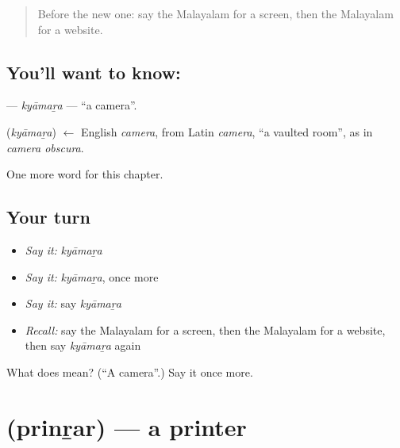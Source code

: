 \label{lesson:ML-C255-kyamara}



\begin{quote}
Before the new one: say the Malayalam for a screen, then the Malayalam for a website.
\end{quote}

\subsection*{You'll want to know: }
\textbf{} — \emph{kyāmaṟa} — \textquotedblleft{}a camera\textquotedblright{}.

\begin{cousinweb}
\textbf{} (\emph{kyāmaṟa}) $\leftarrow$ English \emph{camera}, from Latin \emph{camera}, \textquotedblleft{}a vaulted room\textquotedblright{}, as in \emph{camera obscura}.
\end{cousinweb}

\begin{grammarlens}[title={What you've built}]
One more word for this chapter.
\end{grammarlens}

\subsection*{Your turn}
\begin{itemize}
\raggedright
  \item \emph{Say it:} \emph{kyāmaṟa}
  \item \emph{Say it:} \emph{kyāmaṟa}, once more
  \item \emph{Say it:} say \emph{kyāmaṟa}
  \item \emph{Recall:} say the Malayalam for a screen, then the Malayalam for a website, then say \emph{kyāmaṟa} again
\end{itemize}

\begin{tcolorbox}[breakable,colback=teal!4,colframe=teal!35!black,title={Before you move on}]
What does  mean? (\textquotedblleft{}A camera\textquotedblright{}.) Say it once more.
\end{tcolorbox}
\section[\texorpdfstring{\ml{പ്രിന്റർ} (prinṟar)}{പ്രിന്റർ (prinṟar)}]{ (prinṟar) — a printer}

\label{lesson:ML-C255-prinrar}



